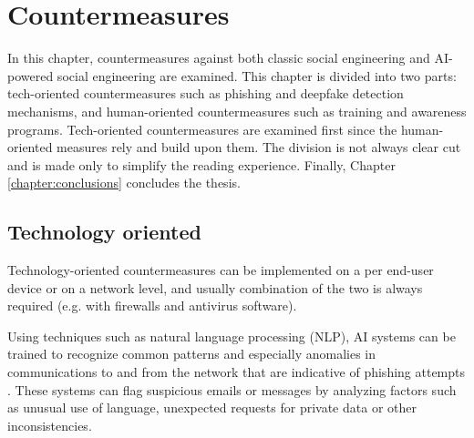 



\chapter{Countermeasures\label{chapter:countermeasures}}

\begin{comment}


\end{comment}

In this chapter, countermeasures against both classic social engineering and AI-powered social engineering are examined. This chapter is divided into two parts: tech-oriented countermeasures such as phishing and deepfake detection mechanisms, and human-oriented countermeasures such as training and awareness programs. Tech-oriented countermeasures are examined first since the human-oriented measures rely and build upon them. The division is not always clear cut and is made only to simplify the reading experience. Finally, Chapter \ref{chapter:conclusions} concludes the thesis.


\section{Technology oriented}

\begin{comment}    
    - Deepfake content detection
    - Spear phishing detection
\end{comment}

Technology-oriented countermeasures can be implemented on a per end-user device or on a network level, and usually combination of the two is always required (e.g. with firewalls and antivirus software).

Using techniques such as natural language processing (NLP), AI systems can be trained to recognize common patterns and especially anomalies in communications to and from the network that are indicative of phishing attempts \citep{basitComprehensiveSurveyAIenabledPhishingAttacks2021}. These systems can flag suspicious emails or messages by analyzing factors such as unusual use of language, unexpected requests for private data or other inconsistencies.


